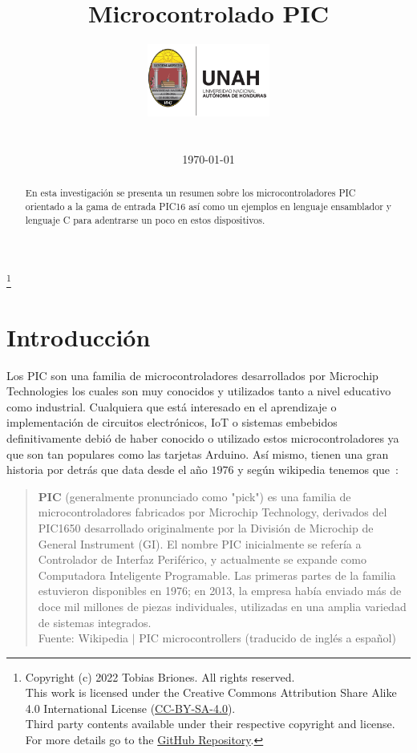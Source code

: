 \documentclass[conference]{IEEEtran}
\title{Microcontrolado PIC}
\author{
    \includegraphics[width = 40mm]{images/logo-unah}\\[8ex]
    \IEEEauthorblockN{Tobias Briones}
    \IEEEauthorblockN{tobias.briones@unah.hn}
    \IEEEauthorblockA{\textit{Universidad Nacional Autónoma de Honduras} \\
    \textit{Ingeniería de Sistemas} \\
    \textit{I PAC 2022} \\
    \textit{IS911-MICROPROCESADORES}} \\\vspace*{20pt} \normalsize  \\
    \today
}
\newcommand\blfootnote[1]{
    \begingroup
    \renewcommand\thefootnote{}\footnote{#1}
    \addtocounter{footnote}{-1}
    \endgroup
}
\begin{document}
    \maketitle

    \begin{abstract}
        En esta investigación se presenta un resumen sobre los
        microcontroladores PIC orientado a la gama de entrada PIC16 así como
        un ejemplos en lenguaje ensamblador y lenguaje C para adentrarse un
        poco en estos dispositivos.
    \end{abstract}

    \tableofcontents

    \blfootnote{
        Copyright (c) 2022 Tobias Briones. All rights reserved. \\
        This work is licensed under the Creative Commons Attribution Share
        Alike 4.0 International License (\href{https://spdx
.org/licenses/CC-BY-SA-4.0}{CC-BY-SA-4.0}). \\
        Third party contents available under their respective copyright and
        license.\\
        For more details go to the \href{https://github
.com/tobiasbriones/cp-unah-is911-microprocessors}{GitHub Repository}.}

    \section{Introducción}

    Los PIC son una familia de microcontroladores desarrollados por Microchip
    Technologies \cite{microchip-technology-inc-2013} los cuales son muy
    conocidos y utilizados tanto a nivel educativo como industrial.
    Cualquiera que está interesado en el aprendizaje o implementación de
    circuitos electrónicos, IoT o sistemas embebidos definitivamente debió de
    haber conocido o utilizado estos microcontroladores ya que son tan
    populares como las tarjetas Arduino. Así mismo, tienen una gran historia
    por detrás que data desde el año $1976$ y según wikipedia tenemos que~\cite{wikipedia-pic-2022}:

    \bigbreak

    \begin{quote}
        \textbf{PIC} (generalmente pronunciado como "pick") es una familia de
        microcontroladores fabricados por Microchip Technology, derivados del
        PIC1650 desarrollado originalmente por la División de Microchip de
        General Instrument (GI). El nombre PIC inicialmente se refería a
        Controlador de Interfaz Periférico, y actualmente se expande como
        Computadora Inteligente Programable. Las primeras partes de la
        familia estuvieron disponibles en 1976; en 2013, la empresa había
        enviado más de doce mil millones de piezas individuales, utilizadas
        en una amplia variedad de sistemas integrados.
        \\
        \small Fuente: Wikipedia $\mid$ PIC microcontrollers (traducido de
        inglés a español) \cite{wikipedia-pic-2022}
    \end{quote}
\end{document}
